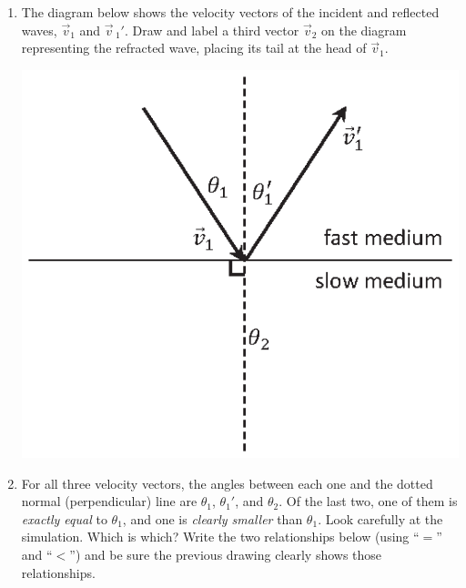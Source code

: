 \begin{enumerate}[labparts]

\item The diagram below shows the velocity vectors of the incident and reflected waves, $\vec{v}_1$ and 
$\vec{v}\,_1'$.  Draw and label a third vector $\vec{v}_2$ on the diagram representing the refracted wave, placing its tail at the head of $\vec{v}_1$.

\begin{center}
\includegraphics{deriving_snells_law/wave_vectors.eps}
\end{center}
\newpage

\item For all three velocity vectors, the angles between each one and the dotted normal (perpendicular) line are $\theta_1$, $\theta_1'$, and $\theta_2$.  Of the last two, one of them is \textit{exactly equal} to $\theta_1$, and one is \textit{clearly smaller} than $\theta_1$.  Look carefully at the simulation.  Which is which?  Write the two relationships below (using ``$=$'' and ``$<$'') and be sure the previous drawing clearly shows those relationships.
\answerspace{0.4in}

\end{enumerate}

